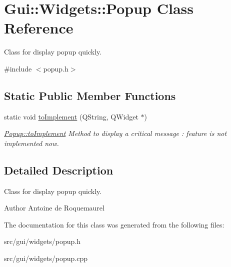 \hypertarget{classGui_1_1Widgets_1_1Popup}{\section{Gui\+:\+:Widgets\+:\+:Popup Class Reference}
\label{classGui_1_1Widgets_1_1Popup}
}


Class for display popup quickly.  




{\ttfamily \#include $<$popup.\+h$>$}

\subsection*{Static Public Member Functions}
\begin{DoxyCompactItemize}
\item 
\hypertarget{classGui_1_1Widgets_1_1Popup_ac4a9958b16b454eab84eeb95a1f01fa7}{static void \hyperlink{classGui_1_1Widgets_1_1Popup_ac4a9958b16b454eab84eeb95a1f01fa7}{to\+Implement} (Q\+String, Q\+Widget $\ast$)}\label{classGui_1_1Widgets_1_1Popup_ac4a9958b16b454eab84eeb95a1f01fa7}

\begin{DoxyCompactList}\small\item\em \hyperlink{classGui_1_1Widgets_1_1Popup_ac4a9958b16b454eab84eeb95a1f01fa7}{Popup\+::to\+Implement} Method to display a critical message \+: feature is not implemented now. \end{DoxyCompactList}\end{DoxyCompactItemize}


\subsection{Detailed Description}
Class for display popup quickly. 

\begin{DoxyAuthor}{Author}
Antoine de Roquemaurel 
\end{DoxyAuthor}


The documentation for this class was generated from the following files\+:\begin{DoxyCompactItemize}
\item 
src/gui/widgets/popup.\+h\item 
src/gui/widgets/popup.\+cpp\end{DoxyCompactItemize}
